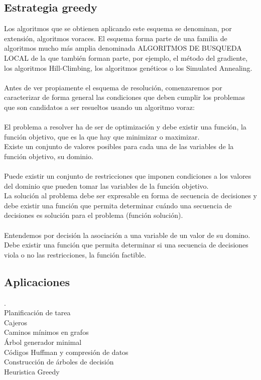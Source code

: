 \documentclass[12pt,twoside]{article}
\begin{document}
\subsection{Estrategia greedy}
Los algoritmos que se obtienen aplicando este esquema se denominan, por extensión, algoritmos voraces. El
esquema forma parte de una familia de algoritmos mucho más amplia denominada
ALGORITMOS DE BUSQUEDA LOCAL de la que también forman parte, por ejemplo, el
método del gradiente, los algoritmos Hill-Climbing, los algoritmos genéticos o los
Simulated Annealing.\\
\\
Antes de ver propiamente el esquema de resolución, comenzaremos por
caracterizar de forma general las condiciones que deben cumplir los problemas que
son candidatos a ser resueltos usando un algoritmo voraz:\\
\\
El problema a resolver ha de ser de optimización  y debe existir una
función, la función objetivo, que es la que hay que minimizar o maximizar.
      \\
Existe un conjunto de valores posibles para cada una de las variables de la
función objetivo, su dominio.\\
\\
Puede existir un conjunto de restricciones que imponen condiciones a los
valores del dominio que pueden tomar las variables de la función objetivo.\\
La solución al problema debe ser expresable en forma de secuencia de
decisiones y debe existir una función que permita determinar cuándo una
secuencia de decisiones es solución para el problema (función solución).\\
\\
Entendemos por decisión la asociación a una variable de un valor de su domino.
Debe existir una función que permita determinar si una secuencia de decisiones
viola o no las restricciones, la función factible.\cite{cota}

\subsection{Aplicaciones}
.\\
  Planificación de tarea\\
  Cajeros\\
  Caminos mínimos en grafos\\
  Árbol generador minimal\\
  Códigos Huffman y compresión de datos\\
  Construcción de árboles de decisión\\
  Heuristica Greedy\\
\\
\end{document}
